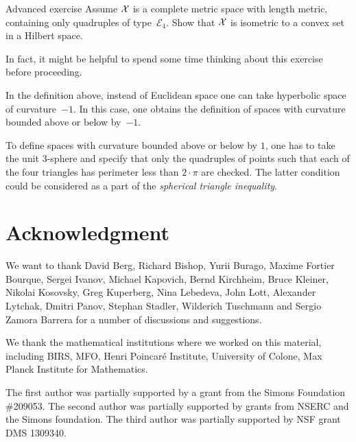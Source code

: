 \begin{thm}{Advanced exercise}\label{ex:convex-set}
Assume $\mathcal{X}$ is a complete metric space with length metric, 
containing only quadruples of type~$\mathcal{E}_4$.
Show that $\mathcal{X}$ is isometric to a convex set in a Hilbert space.
\end{thm}

In fact, it might be helpful to spend some time thinking about this exercise before proceeding.

In the definition above, 
instead of  Euclidean space 
one can take  
hyperbolic space of curvature~$-1$.
In this case,
one obtains the definition of spaces with curvature bounded above or below by~$-1$.

To define spaces with curvature bounded above or below by $1$,
one has to take the unit 3-sphere 
and specify that only the quadruples of points such that each of the four triangles has perimeter 
less than $2\cdot\pi$ are checked.
The latter condition could be considered as a part of the {}\emph{spherical triangle inequality}.


\section*{Acknowledgment}
We want to  thank 
David Berg,
Richard Bishop,
Yurii Burago,
Maxime Fortier Bourque,
Sergei Ivanov,
Michael Kapovich, 
Bernd Kirchheim, 
Bruce Kleiner,
Nikolai Kosovsky,
Greg Kuperberg,
Nina Lebedeva,
John Lott,
Alexander Lytchak,
Dmitri Panov,
Stephan Stadler,
Wilderich Tuschmann
and 
Sergio Zamora Barrera
for a number of discussions and suggestions.

We thank the mathematical institutions where we worked on this material,  including
BIRS, 
MFO, 
Henri Poincar\'{e} Institute,
University of Colone, 
Max Planck Institute for Mathematics. 

The first author was partially supported by a grant from the Simons Foundation \#209053.
The second author was partially supported by grants from NSERC and the Simons foundation.
The third author was partially supported by NSF grant DMS 1309340.

